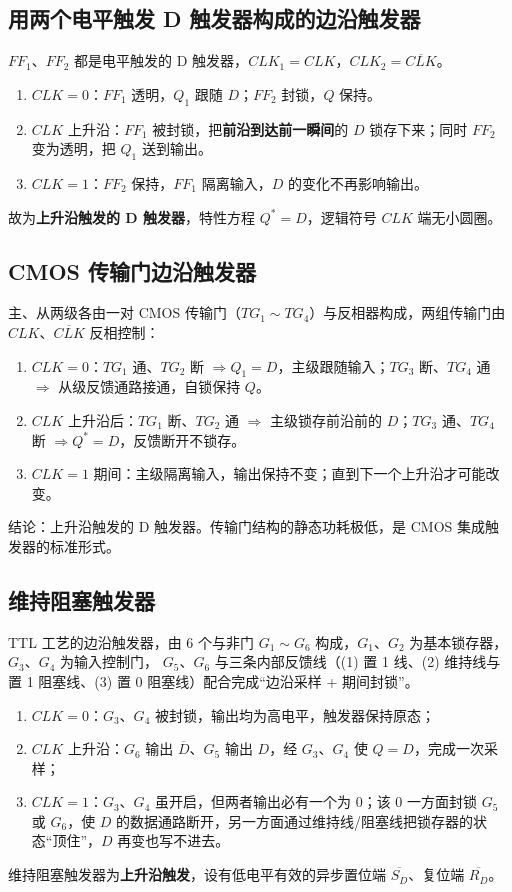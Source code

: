 \subsection{用两个电平触发 D 触发器构成的边沿触发器}
$FF_1$、$FF_2$ 都是电平触发的 D 触发器，$CLK_1=CLK$，$CLK_2=\overline{CLK}$。
\begin{enumerate}
    \item $CLK=0$：$FF_1$ 透明，$Q_1$ 跟随 $D$；$FF_2$ 封锁，$Q$ 保持。
    \item $CLK$ 上升沿：$FF_1$ 被封锁，把\textbf{前沿到达前一瞬间}的 $D$ 锁存下来；同时 $FF_2$ 变为透明，把 $Q_1$ 送到输出。
    \item $CLK=1$：$FF_2$ 保持，$FF_1$ 隔离输入，$D$ 的变化不再影响输出。
\end{enumerate}
故为\textbf{上升沿触发的 D 触发器}，特性方程 $Q^*=D$，逻辑符号 $CLK$ 端无小圆圈。

\subsection{CMOS 传输门边沿触发器}
主、从两级各由一对 CMOS 传输门（$TG_1\sim TG_4$）与反相器构成，两组传输门由 $CLK$、$\overline{CLK}$ 反相控制：
\begin{enumerate}
    \item $CLK=0$：$TG_1$ 通、$TG_2$ 断 $\Rightarrow Q_1=D$，主级跟随输入；$TG_3$ 断、$TG_4$ 通 $\Rightarrow$ 从级反馈通路接通，自锁保持 $Q$。
    \item $CLK$ 上升沿后：$TG_1$ 断、$TG_2$ 通 $\Rightarrow$ 主级锁存前沿前的 $D$；$TG_3$ 通、$TG_4$ 断 $\Rightarrow Q^*=D$，反馈断开不锁存。
    \item $CLK=1$ 期间：主级隔离输入，输出保持不变；直到下一个上升沿才可能改变。
\end{enumerate}
结论：上升沿触发的 D 触发器。传输门结构的静态功耗极低，是 CMOS 集成触发器的标准形式。

\subsection{维持阻塞触发器}
TTL 工艺的边沿触发器，由 6 个与非门 $G_1\sim G_6$ 构成，$G_1$、$G_2$ 为基本锁存器，$G_3$、$G_4$ 为输入控制门，
$G_5$、$G_6$ 与三条内部反馈线（(1) 置 1 线、(2) 维持线与置 1 阻塞线、(3) 置 0 阻塞线）配合完成“边沿采样 + 期间封锁”。
\begin{enumerate}
    \item $CLK=0$：$G_3$、$G_4$ 被封锁，输出均为高电平，触发器保持原态；
    \item $CLK$ 上升沿：$G_6$ 输出 $\overline{D}$、$G_5$ 输出 $D$，经 $G_3$、$G_4$ 使 $Q=D$，完成一次采样；
    \item $CLK=1$：$G_3$、$G_4$ 虽开启，但两者输出必有一个为 0；该 0 一方面封锁 $G_5$ 或 $G_6$，使 $D$ 的数据通路断开，另一方面通过维持线/阻塞线把锁存器的状态“顶住”，$D$ 再变也写不进去。
\end{enumerate}
维持阻塞触发器为\textbf{上升沿触发}，设有低电平有效的异步置位端 $\overline{S_D}$、复位端 $\overline{R_D}$。

